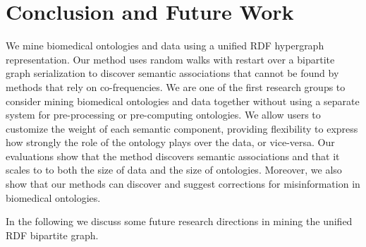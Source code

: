 \section{Conclusion and Future Work}
\label{sec:conclusion}

%

We mine biomedical ontologies and  data using a unified RDF hypergraph representation.  Our method uses random walks with restart over a bipartite graph serialization to discover semantic associations that cannot be found by methods that rely on co-frequencies. We are one of the first research groups to consider mining biomedical ontologies and data together without using a separate system for pre-processing or pre-computing ontologies. We allow users to customize the weight of each semantic component, providing flexibility to express how strongly the role of the ontology plays over the data, or vice-versa. Our evaluations show that the method discovers semantic associations and that it scales to to both the size of data and the size of ontologies. Moreover, we also show that our methods can discover and suggest corrections for misinformation in biomedical ontologies.

In the following we discuss some future research directions in mining the unified RDF bipartite graph.

